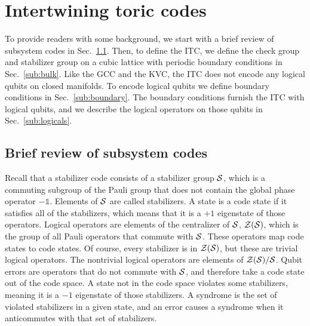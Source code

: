 \section{Intertwining toric codes} \label{sec:build}

To provide readers with some background, we start with a brief review of subsystem codes in Sec.~\ref{sub:subsystem}. Then, to define the ITC, we define the check group and stabilizer group on a cubic lattice with periodic boundary conditions in Sec.~\ref{sub:bulk}. Like the GCC and the KVC, the ITC does not encode any logical qubits on closed manifolds. To encode logical qubits we define boundary conditions in Sec.~\ref{sub:boundary}. The boundary conditions furnish the ITC with logical qubits, and we describe the logical operators on those qubits in Sec.~\ref{sub:logicals}.

\subsection{Brief review of subsystem codes} \label{sub:subsystem}

Recall that a stabilizer code consists of a stabilizer group $\S$, which is a commuting subgroup of the Pauli group that does not contain the global phase operator $-\mathbb{1}$. Elements of $\S$ are called stabilizers. A state is a code state if it satisfies all of the stabilizers, which means that it is a $+1$ eigenstate of those operators. Logical operators are elements of the centralizer of $\S$, $\Z(\S)$, which is the group of all Pauli operators that commute with $\S$.
These operators map code states to code states. Of course, every stabilizer is in $\Z(\S)$, but these are trivial logical operators. The nontrivial logical operators are elements of $\Z(\S) / \S$. Qubit errors are operators that do not commute with $\S$, and therefore take a code state out of the code space. A state not in the code space violates some stabilizers, meaning it is a $-1$ eigenstate of those stabilizers. 
A syndrome is the set of violated stabilizers in a given state, and an error causes a syndrome when it anticommutes with that set of stabilizers. 

